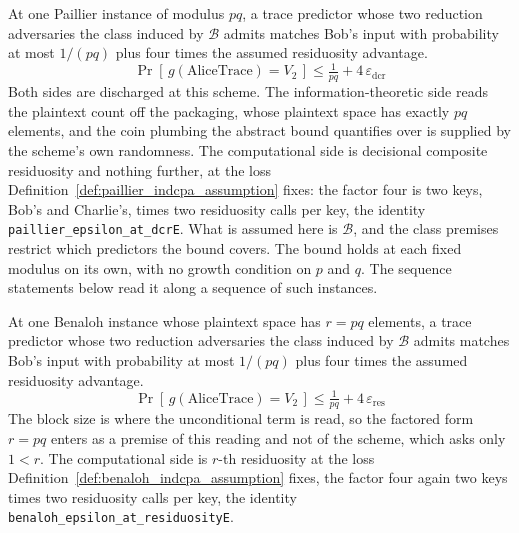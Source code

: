\begin{corollary}
  \label{cor:alice_guess_paillier}
  \rocqok
  At one Paillier instance of modulus $p q$, a trace predictor whose two
  reduction adversaries the class induced by $\mathcal{B}$ admits matches
  Bob's input with probability at most $1/(p q)$ plus four times the assumed
  residuosity advantage.
  \[ \Pr[\,g(\mathrm{AliceTrace}) = V_2\,]
       \le \tfrac{1}{p q} + 4\,\varepsilon_{\mathrm{dcr}} \]
  Both sides are discharged at this scheme. The information-theoretic side
  reads the plaintext count off the packaging, whose plaintext space has
  exactly $p q$ elements, and the coin plumbing the abstract bound quantifies
  over is supplied by the scheme's own randomness. The computational side is
  decisional composite residuosity and nothing further, at the loss
  Definition~\ref{def:paillier_indcpa_assumption} fixes: the factor four is
  two keys, Bob's and Charlie's, times two residuosity calls per key, the
  identity \texttt{paillier\_epsilon\_at\_dcrE}. What is assumed here is
  $\mathcal{B}$, and the class premises restrict which predictors the bound
  covers. The bound holds at each fixed modulus on its own, with no growth
  condition on $p$ and $q$. The sequence statements below read it along a
  sequence of such instances.
\end{corollary}

\begin{corollary}
  \label{cor:alice_guess_benaloh}
  \rocqok
  At one Benaloh instance whose plaintext space has $r = p q$ elements, a
  trace predictor whose two reduction adversaries the class induced by
  $\mathcal{B}$ admits matches Bob's input with probability at most
  $1/(p q)$ plus four times the assumed residuosity advantage.
  \[ \Pr[\,g(\mathrm{AliceTrace}) = V_2\,]
       \le \tfrac{1}{p q} + 4\,\varepsilon_{\mathrm{res}} \]
  The block size is where the unconditional term is read, so the factored
  form $r = p q$ enters as a premise of this reading and not of the scheme,
  which asks only $1 < r$. The computational side is $r$-th residuosity at
  the loss Definition~\ref{def:benaloh_indcpa_assumption} fixes, the factor
  four again two keys times two residuosity calls per key, the identity
  \texttt{benaloh\_epsilon\_at\_residuosityE}.
\end{corollary}

